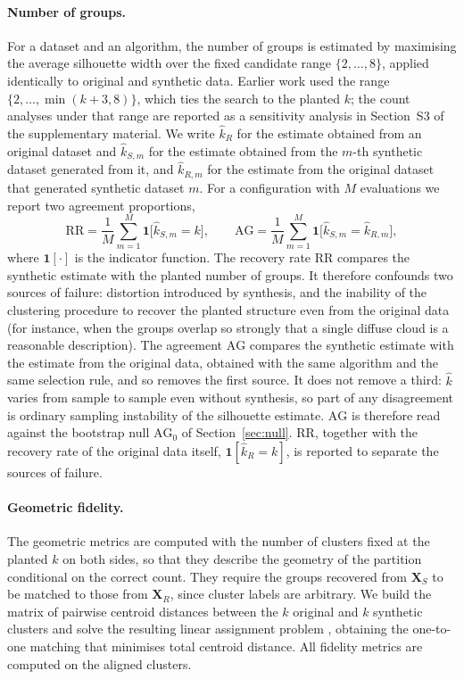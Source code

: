 \documentclass[pdflatex,referee]{sn-jnl}
\newcommand{\ind}{\mathbf{1}}
\newcommand{\bX}{\mathbf{X}}
\begin{document}
\paragraph{Number of groups.}
For a dataset and an algorithm, the number of groups is estimated by maximising
the average silhouette width \citep{rousseeuw1987} over the fixed candidate
range $\{2,\dots,8\}$, applied identically to original and synthetic data.
Earlier work  used the range $\{2,\dots,\min(k+3,8)\}$, which
ties the search to the planted $k$; the count analyses under that range are
reported as a sensitivity analysis in Section~S3 of the supplementary material.
We write $\hat{k}_R$ for the estimate obtained from an original dataset and
$\hat{k}_{S,m}$ for the estimate obtained from the $m$-th synthetic dataset
generated from it, and $\hat{k}_{R,m}$ for the estimate from the original
dataset that generated synthetic dataset $m$. For a configuration with $M$
evaluations we report two agreement proportions,
\begin{equation}
  \mathrm{RR} = \frac{1}{M} \sum_{m=1}^{M}
    \ind\bigl[\hat{k}_{S,m} = k\bigr],
  \qquad
  \mathrm{AG} = \frac{1}{M} \sum_{m=1}^{M}
    \ind\bigl[\hat{k}_{S,m} = \hat{k}_{R,m}\bigr],
  \label{eq:sr}
\end{equation}
where $\ind[\cdot]$ is the indicator function. The recovery rate $\mathrm{RR}$
compares the synthetic estimate with the planted number of groups. It
therefore confounds two sources of failure: distortion introduced by
synthesis, and the inability of the clustering procedure to recover the
planted structure even from the original data (for instance, when the groups
overlap so strongly that a single diffuse cloud is a reasonable description).
The agreement $\mathrm{AG}$ compares the synthetic estimate with the estimate
from the original data, obtained with the same algorithm and the same
selection rule, and so removes the first source. It does not remove a third:
$\hat{k}$ varies from sample to sample even without synthesis, so part of any
disagreement is ordinary sampling instability of the silhouette estimate.
$\mathrm{AG}$ is therefore read against the bootstrap null
$\mathrm{AG}_0$ of Section~\ref{sec:null}. $\mathrm{RR}$, together with the
recovery rate of the original data itself, $\ind[\hat{k}_R = k]$, is reported
to separate the sources of failure.

\paragraph{Geometric fidelity.}
The geometric metrics are computed with the number of clusters fixed at the
planted $k$ on both sides, so that they describe the geometry of the
partition conditional on the correct count. They require the groups recovered
from $\bX_S$ to be matched to those from $\bX_R$, since cluster labels are
arbitrary. We build the matrix of pairwise centroid distances between the $k$
original and $k$ synthetic clusters and solve the resulting linear assignment
problem \citep{kuhn1955}, obtaining the one-to-one matching that minimises
total centroid distance. All fidelity metrics are computed on the aligned
clusters.
\end{document}
